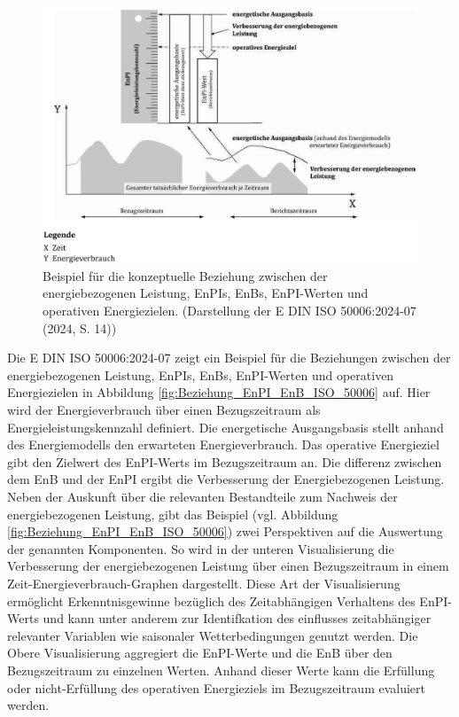 \begin{figure}[H]
    \centering
    \includegraphics[width=1\textwidth]{../../Ressourcen/Abbildungen/ISO_50006_Beispiel_EnPI_EnB.jpg}
    \caption{Beispiel für die konzeptuelle Beziehung zwischen der energiebezogenen Leistung, EnPIs, EnBs, EnPI-Werten und operativen Energiezielen. (Darstellung der E DIN ISO 50006:2024-07 (2024, S. 14))}
    \label{fig:Beziehung_EnPI_EnB_ISO_50006}
\end{figure}

Die E DIN ISO 50006:2024-07 zeigt ein Beispiel für die Beziehungen zwischen der energiebezogenen Leistung, EnPIs, EnBs, EnPI-Werten und operativen Energiezielen 
in Abbildung \eqref{fig:Beziehung_EnPI_EnB_ISO_50006} auf.
Hier wird der Energieverbrauch über einen Bezugszeitraum als Energieleistungskennzahl definiert.
Die energetische Ausgangsbasis stellt anhand des Energiemodells den erwarteten Energieverbrauch.
Das operative Energieziel gibt den Zielwert des EnPI-Werts im Bezugszeitraum an. 
Die differenz zwischen dem EnB und der EnPI ergibt die Verbesserung der Energiebezogenen Leistung.
Neben der Auskunft über die relevanten Bestandteile zum Nachweis der energiebezogenen Leistung, gibt das Beispiel (vgl. Abbildung \eqref{fig:Beziehung_EnPI_EnB_ISO_50006}) 
zwei Perspektiven auf die Auswertung der genannten Komponenten.
So wird in der unteren Visualisierung die Verbesserung der energiebezogenen Leistung über einen Bezugszeitraum in einem Zeit-Energieverbrauch-Graphen dargestellt.
Diese Art der Visualisierung ermöglicht Erkenntnisgewinne bezüglich des Zeitabhängigen Verhaltens des EnPI-Werts und kann unter anderem zur Identifkation des 
einflusses zeitabhängiger relevanter Variablen wie saisonaler Wetterbedingungen genutzt werden. 
Die Obere Visualisierung aggregiert die EnPI-Werte und die EnB über den Bezugszeitraum zu einzelnen Werten. 
Anhand dieser Werte kann die Erfüllung oder nicht-Erfüllung des operativen Energieziels im Bezugszeitraum evaluiert werden.

